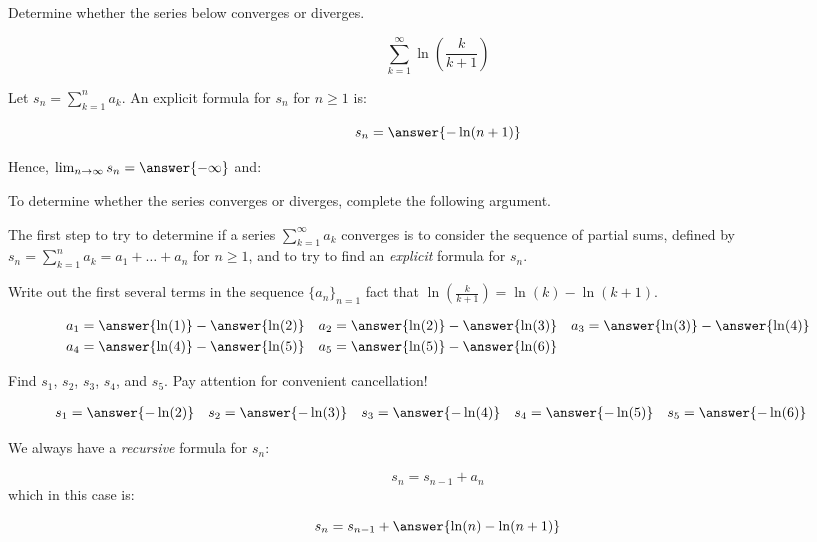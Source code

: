 \documentclass{ximera}
\author{Jim Talamo}
\begin{document}
\begin{exercise}
Determine whether the series below converges or diverges.

\[
\sum_{k=1}^{\infty} \ln \left(\frac{k}{k+1}\right)
\]

Let $s_n = \sum_{k=1}^n a_k$.  An explicit formula for $s_n$ for $n \geq 1$ is:

\[
s_n = \answer{-\ln(n+1)}
\]

\begin{exercise}
Hence, $\lim_{n \to \infty} s_n = \answer{-\infty}$ and:

\begin{multipleChoice}
\end{multipleChoice}

\begin{hint}
To determine whether the series converges or diverges, complete the following argument.

The first step to try to determine if a series $\sum_{k=1}^{\infty}a_k$ converges is to consider the sequence of partial sums, defined by $s_n = \sum_{k=1}^{n} a_k = a_1+\ldots + a_n$ for $n \geq 1$, and to try to find an \emph{explicit} formula for $s_n$.


Write out the first several terms in the sequence $\{a_n\}_{n=1}$ fact that  $\ln\left(\frac{k}{k+1}\right) = \ln(k)-\ln(k+1)$.

\begin{align*}
a_1 &= \answer{\ln(1)} - \answer{\ln(2)} & a_2 &= \answer{\ln(2)}-\answer{\ln(3)} & a_3 &= \answer{\ln(3)}-\answer{\ln(4)} \\
 a_4 &= \answer{\ln(4)}-\answer{\ln(5)}& a_5 &= \answer{\ln(5)}-\answer{\ln(6)}
\end{align*}

\begin{question}
Find $s_1$, $s_2$, $s_3$, $s_4$, and $s_5$.  Pay attention for convenient cancellation!

\begin{align*}
s_1 &= \answer{-\ln(2)} & s_2 &=  \answer{-\ln(3)} & s_3 &=  \answer{-\ln(4)} & s_4 &= \answer{-\ln(5)}& s_5 &= \answer{-\ln(6)} 
\end{align*}

\begin{question}
We always have a \emph{recursive} formula for $s_n$:

\[
s_n = s_{n-1} +a_n
\]
 which in this case is:
 
 \[
 s_n= s_{n-1} + \answer{\ln(n)-\ln(n+1)}
 \]
 

\end{question}
\end{question}
\end{hint}
\end{exercise}
\end{exercise}
\end{document}
